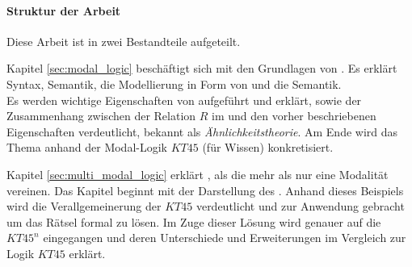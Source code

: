 
\paragraph{Struktur der Arbeit} %
\label{par:struktur_der_arbeit}

Diese Arbeit ist in zwei Bestandteile aufgeteilt. 

Kapitel \ref{sec:modal_logic} beschäftigt sich mit den Grundlagen von \ML. 
Es erklärt Syntax, Semantik, die Modellierung in Form von \KSn und die \PW Semantik.\\
Es werden wichtige Eigenschaften von \ML aufgeführt und erklärt, sowie der Zusammenhang zwischen der Relation $R$ im \KM und den vorher beschriebenen Eigenschaften verdeutlicht, bekannt als \emph{Ähnlichkeitstheorie}.
Am Ende wird das Thema anhand der Modal-Logik $KT45$ (für Wissen) konkretisiert.

Kapitel \ref{sec:multi_modal_logic} erklärt \MMLn, als \MLn die mehr als nur eine Modalität vereinen. Das Kapitel beginnt mit der Darstellung des \WMR. 
Anhand dieses Beispiels wird die Verallgemeinerung der \ML $KT45$ verdeutlicht und zur Anwendung gebracht um das Rätsel formal zu lösen.
Im Zuge dieser Lösung wird genauer auf die \MML $KT45^n$ eingegangen und deren Unterschiede und Erweiterungen im Vergleich zur Logik $KT45$ erklärt.





